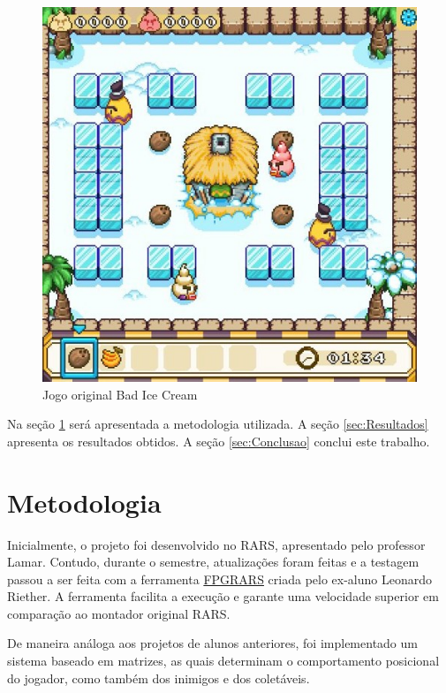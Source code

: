 \documentclass[a4paper]{sbgames}
\begin{document}
\begin{figure}[htb]
  \begin{center}
   \includegraphics[width=1.0\linewidth]{./Figures/mapaoriginal.jpg}
  \end{center}
  \caption{Jogo original Bad Ice Cream}
  \label{fig:01}
\end{figure}


Na seção \ref{sec:Metodologia} será apresentada a metodologia utilizada. A seção \ref{sec:Resultados} apresenta os resultados obtidos. A seção \ref{sec:Conclusao} conclui este trabalho.

\section{Metodologia}
\label{sec:Metodologia}

Inicialmente, o projeto foi desenvolvido no RARS, apresentado pelo professor Lamar. Contudo, durante o semestre, atualizações foram feitas e a testagem passou a ser feita com a ferramenta \href{https://github.com/LeoRiether/FPGRARS}{FPGRARS} criada pelo ex-aluno Leonardo Riether. A ferramenta facilita a execução e garante uma velocidade superior em comparação ao montador original RARS.

De maneira análoga aos projetos de alunos anteriores, foi implementado um sistema baseado em matrizes, as quais determinam o comportamento posicional do jogador, como também dos inimigos e dos coletáveis. 
\end{document}
